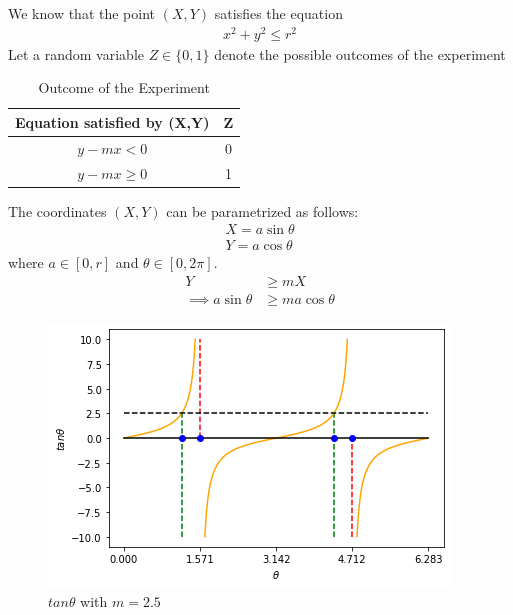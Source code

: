 
We know that the point $(X,Y)$ satisfies the equation 
\begin{align}
x^2 + y^2 \leq r^2 
\end{align}
Let a random variable $Z\in \{0,1\}$ denote the possible outcomes of the experiment
\begin{table}[h]
\centering
    \begin{tabular}{|c|c|}
        \hline
        Equation satisfied by (X,Y)& Z    \\\hline
        $y-mx<0$ & 0    \\\hline
        $y-mx\geq0$ & 1 \\\hline
    \end{tabular}
\caption{Outcome of the Experiment}
\label{ma2001-2.23:table=1}
\end{table}

The coordinates $(X,Y)$ can be parametrized as follows:
\begin{align}
    X = a\sin\theta\\
    Y = a\cos\theta
\end{align} 
where $a \in [0,r]$ and $\theta \in [0, 2\pi]$. 
\begin{align}
    Y &\geq mX\\
    \implies a\sin\theta &\geq ma\cos\theta
\end{align}

\begin{figure}[h]
    \centering
    \includegraphics[width=\columnwidth]{solutions/adv/ma/2001/2.23/figures/tanx.png}
    \caption{$tan\theta$ with $m=2.5$}
    \label{ma2001-2.23:tanx}
\end{figure}

